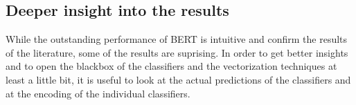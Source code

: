 \documentclass[12pt, a4paper, titlepage]{article}
\begin{document}







\subsection{Deeper insight into the results}
While the outstanding performance of \ac{BERT} is intuitive and confirm the results of the literature, some of the results are suprising. In order to get better insights and to open the blackbox of the classifiers and the vectorization techniques at least a little bit, it is useful to look at the actual predictions of the classifiers and at the encoding of the individual classifiers. 

\end{document}
